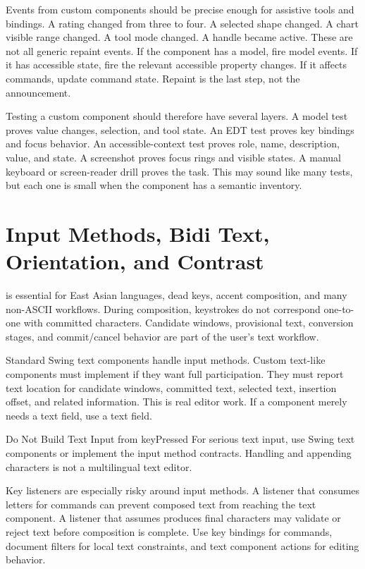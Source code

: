 Events from custom components should be precise enough for assistive tools and
bindings. A rating changed from three to four. A selected shape changed. A chart
visible range changed. A tool mode changed. A handle became active. These are
not all generic repaint events. If the component has a model, fire model events.
If it has accessible state, fire the relevant accessible property changes. If it
affects commands, update command state. Repaint is the last step, not the
announcement.

Testing a custom component should therefore have several layers. A model test
proves value changes, selection, and tool state. An EDT test proves key bindings
and focus behavior. An accessible-context test proves role, name, description,
value, and state. A screenshot proves focus rings and visible states. A manual
keyboard or screen-reader drill proves the task. This may sound like many
tests, but each one is small when the component has a semantic inventory.

\section{Input Methods, Bidi Text, Orientation, and Contrast}

 is essential for East Asian languages, dead keys, accent composition, and many non-ASCII workflows. During composition, keystrokes do not correspond one-to-one with committed characters. Candidate windows, provisional text, conversion stages, and commit/cancel behavior are part of the user's text workflow.

Standard Swing text components handle input methods. Custom text-like components must implement  if they want full participation. They must report text location for candidate windows, committed text, selected text, insertion offset, and related information. This is real editor work. If a component merely needs a text field, use a text field.

\begin{detailbox}{Do Not Build Text Input from keyPressed}
For serious text input, use Swing text components or implement the input method contracts. Handling  and appending characters is not a multilingual text editor.
\end{detailbox}

Key listeners are especially risky around input methods. A listener that consumes letters for commands can prevent composed text from reaching the text component. A listener that assumes  produces final characters may validate or reject text before composition is complete. Use key bindings for commands, document filters for local text constraints, and text component actions for editing behavior.

